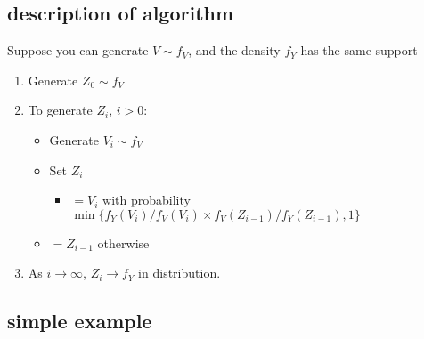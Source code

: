 \subsection{description of algorithm \citep[page 254]{CB02}}

Suppose you can generate $V \sim f_V$, and the density $f_Y$ has the same
support
\begin{enumerate}
\item Generate $Z_0 \sim f_V$
\item To generate $Z_i$, $i > 0$:
\begin{itemize}
\item Generate $V_i \sim f_V$
\item Set $Z_i$
\begin{itemize}
\item $= V_i$ with probability $\min\{ f_Y(V_i)/ f_V(V_i)
  \times f_V(Z_{i-1}) / f_Y(Z_{i-1}), 1\}$
\end{itemize}
\item $= Z_{i-1}$ otherwise
\end{itemize}
\item As $i \to \infty$, $Z_i \to f_Y$ in distribution.
\end{enumerate}

\subsection{simple example}

